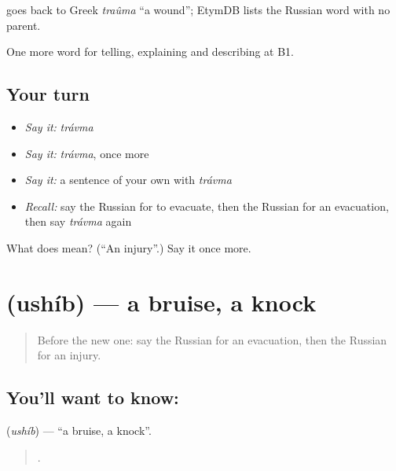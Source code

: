 \begin{cousinweb}
\emph{} goes back to Greek \emph{traûma} \textquotedblleft{}a wound\textquotedblright{}; EtymDB lists the Russian word with no parent.
\end{cousinweb}

\begin{grammarlens}[title={What you've built}]
One more word for telling, explaining and describing at B1.
\end{grammarlens}

\subsection*{Your turn}
\begin{itemize}
\raggedright
  \item \emph{Say it:} \emph{trávma}
  \item \emph{Say it:} \emph{trávma}, once more
  \item \emph{Say it:} a sentence of your own with \emph{trávma}
  \item \emph{Recall:} say the Russian for to evacuate, then the Russian for an evacuation, then say \emph{trávma} again
\end{itemize}

\begin{tcolorbox}[breakable,colback=teal!4,colframe=teal!35!black,title={Before you move on}]
What does  mean? (\textquotedblleft{}An injury\textquotedblright{}.) Say it once more.
\end{tcolorbox}
\section[\texorpdfstring{\ru{ушиб} (ushíb)}{ушиб (ushíb)}]{ (ushíb) — a bruise, a knock}

\label{lesson:RU-C297-ushib}



\begin{quote}
Before the new one: say the Russian for an evacuation, then the Russian for an injury.
\end{quote}

\subsection*{You'll want to know: }
\textbf{} (\emph{ushíb}) — \textquotedblleft{}a bruise, a knock\textquotedblright{}.

\begin{quote}
    .
\end{quote}

